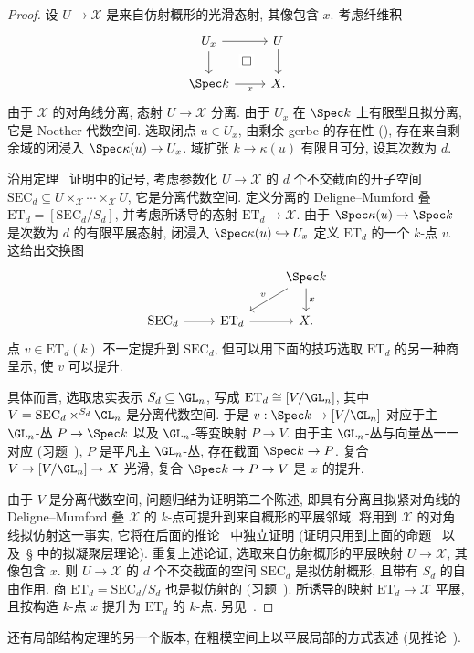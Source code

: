 \begin{proof}
设 $U\to\mathcal X$ 是来自仿射概形的光滑态射, 其像包含 $x$. 考虑纤维积
\[
\begin{tikzcd}
U_x\arrow[r]\arrow[d]&U\arrow[d]\\
\Spec k\arrow[r,"x"']\arrow[ur,phantom,"\square" description]&\mathcal X.
\end{tikzcd}
\]
由于 $\mathcal X$ 的对角线分离, 态射 $U\to\mathcal X$ 分离. 由于 $U_x$ 在 $\Spec k$ 上有限型且拟分离, 它是 Noether 代数空间. 选取闭点 $u\in U_x$, 由剩余 gerbe 的存在性 (), 存在来自剩余域的闭浸入 $\Spec\kappa(u)\to U_x$. 域扩张 $k\to\kappa(u)$ 有限且可分, 设其次数为 $d$.

沿用定理~ 证明中的记号, 考虑参数化 $U\to\mathcal X$ 的 $d$ 个不交截面的开子空间 $\mathrm{SEC}_d\subseteq U\times_{\mathcal X}\cdots\times_{\mathcal X}U$, 它是分离代数空间. 定义分离的 Deligne--Mumford 叠 $\mathrm{ET}_d=[\mathrm{SEC}_d/S_d]$, 并考虑所诱导的态射 $\mathrm{ET}_d\to\mathcal X$. 由于 $\Spec\kappa(u)\to\Spec k$ 是次数为 $d$ 的有限平展态射, 闭浸入 $\Spec\kappa(u)\hookrightarrow U_x$ 定义 $\mathrm{ET}_d$ 的一个 $k$-点 $v$. 这给出交换图
\[
\begin{tikzcd}
&&\Spec k\arrow[dl,"v"']\arrow[d,"x"]\\
\mathrm{SEC}_d\arrow[r]&\mathrm{ET}_d\arrow[r]&\mathcal X.
\end{tikzcd}
\]
点 $v\in\mathrm{ET}_d(k)$ 不一定提升到 $\mathrm{SEC}_d$, 但可以用下面的技巧选取 $\mathrm{ET}_d$ 的另一种商呈示, 使 $v$ 可以提升.

具体而言, 选取忠实表示 $S_d\subseteq\GL_n$, 写成 $\mathrm{ET}_d\cong[V/\GL_n]$, 其中 $V=\mathrm{SEC}_d\times^{S_d}\GL_n$ 是分离代数空间. 于是 $v:\Spec k\to[V/\GL_n]$ 对应于主 $\GL_n$-丛 $P\to\Spec k$ 以及 $\GL_n$-等变映射 $P\to V$. 由于主 $\GL_n$-丛与向量丛一一对应 (习题~), $P$ 是平凡主 $\GL_n$-丛, 存在截面 $\Spec k\to P$. 复合 $V\to[V/\GL_n]\to\mathcal X$ 光滑, 复合 $\Spec k\to P\to V$ 是 $x$ 的提升.

由于 $V$ 是分离代数空间, 问题归结为证明第二个陈述, 即具有分离且拟紧对角线的 Deligne--Mumford 叠 $\mathcal X$ 的 $k$-点可提升到来自概形的平展邻域. 将用到 $\mathcal X$ 的对角线拟仿射这一事实, 它将在后面的推论~ 中独立证明 (证明只用到上面的命题~ 以及~\S{} 中的拟凝聚层理论). 重复上述论证, 选取来自仿射概形的平展映射 $U\to\mathcal X$, 其像包含 $x$. 则 $U\to\mathcal X$ 的 $d$ 个不交截面的空间 $\mathrm{SEC}_d$ 是拟仿射概形, 且带有 $S_d$ 的自由作用. 商 $\mathrm{ET}_d=\mathrm{SEC}_d/S_d$ 也是拟仿射的 (习题~). 所诱导的映射 $\mathrm{ET}_d\to\mathcal X$ 平展, 且按构造 $k$-点 $x$ 提升为 $\mathrm{ET}_d$ 的 $k$-点. 另见~\cite[定理 $6.3$]{LMB00}.
\end{proof}
还有局部结构定理的另一个版本, 在粗模空间上以平展局部的方式表述 (见推论~).
